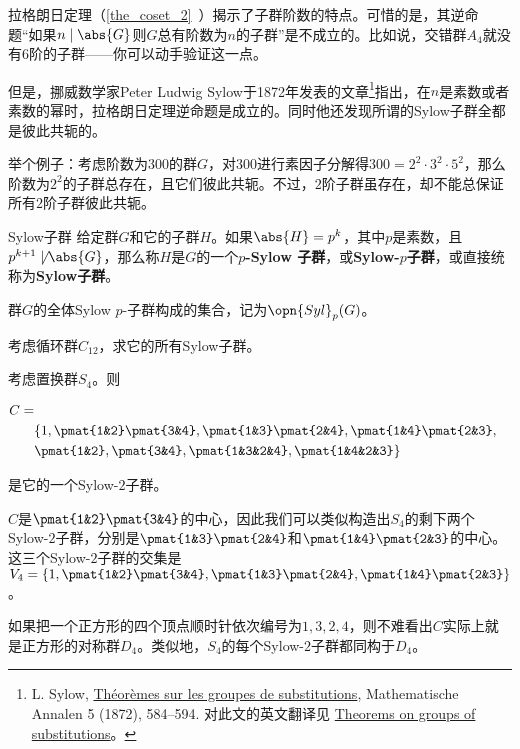 



拉格朗日定理（\autoref{the_coset_2}~）揭示了子群阶数的特点。可惜的是，其逆命题“如果$n\mid \abs{G}$则$G$总有阶数为$n$的子群”是不成立的。比如说，交错群$A_4$就没有$6$阶的子群——你可以动手验证这一点。

但是，挪威数学家Peter Ludwig Sylow于1872年发表的文章\footnote{L. Sylow, \href{https://eudml.org/doc/156588}{Théorèmes sur les groupes de substitutions}, Mathematische Annalen 5 (1872), 584–594. 对此文的英文翻译见 \href{http://www.maths.qmul.ac.uk/~raw/pubs_files/Sylow.pdf}{Theorems on groups of substitutions}。}指出，在$n$是素数或者素数的幂时，拉格朗日定理逆命题是成立的。同时他还发现所谓的Sylow子群全都是彼此共轭的。

举个例子：考虑阶数为$300$的群$G$，对$300$进行素因子分解得$300=2^2\cdot 3^2\cdot 5^2$，那么阶数为$2^2$的子群总存在，且它们彼此共轭。不过，$2$阶子群虽存在，却不能总保证所有$2$阶子群彼此共轭。


\begin{definition}{Sylow子群}\label{def_Sylow_1}
给定群$G$和它的子群$H$。如果$\abs{H}=p^k$，其中$p$是素数，且$p^{k+1}\not\mid\abs{G}$，那么称$H$是$G$的一个$p$\textbf{-Sylow 子群}，或\textbf{Sylow-}$p$\textbf{子群}，或直接统称为\textbf{Sylow子群}。

群$G$的全体Sylow $p$-子群构成的集合，记为$\opn{Syl}_p(G)$。
\end{definition}



\begin{exercise}{}
考虑循环群$C_{12}$，求它的所有Sylow子群。
\end{exercise}

\begin{example}{}
考虑置换群$S_4$。则


\begin{equation}
\begin{aligned}
C=\\
&\{1, \pmat{1&2}\pmat{3&4}, \pmat{1&3}\pmat{2&4}, \pmat{1&4}\pmat{2&3},\\
& \pmat{1&2}, \pmat{3&4}, \pmat{1&3&2&4}, \pmat{1&4&2&3}\}
\end{aligned}
\end{equation}

是它的一个Sylow-$2$子群。

$C$是$\pmat{1&2}\pmat{3&4}$的中心，因此我们可以类似构造出$S_4$的剩下两个Sylow-$2$子群，分别是$\pmat{1&3}\pmat{2&4}$和$\pmat{1&4}\pmat{2&3}$的中心。这三个Sylow-$2$子群的交集是$V_4=\{1, \pmat{1&2}\pmat{3&4}, \pmat{1&3}\pmat{2&4}, \pmat{1&4}\pmat{2&3}\}$。

如果把一个正方形的四个顶点顺时针依次编号为$1, 3, 2, 4$，则不难看出$C$实际上就是正方形的对称群$D_4$。类似地，$S_4$的每个Sylow-$2$子群都同构于$D_4$。

\end{example}

